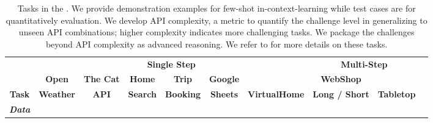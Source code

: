 


\begin{table}[]
\centering
\caption{Tasks in the \snact. We provide demonstration examples for few-shot in-context-learning while test cases are for quantitatively evaluation. We develop API complexity, a metric to quantify the challenge level in generalizing to unseen API combinations; higher complexity indicates more challenging tasks. We package the challenges beyond API complexity as advanced reasoning. We refer to  for more details on these tasks.}
\label{tab:all_tasks}
\begin{adjustbox}{max width=\textwidth}
\begin{tabular}{@{}cccccccccc@{}}
\toprule
\multicolumn{1}{l}{}            & \multicolumn{6}{c}{\textbf{Single Step}}                                         & \multicolumn{2}{c}{\textbf{Multi-Step}}                                                             \\
\cmidrule(lr){2-7} \cmidrule(lr){8-9} 
                                & \textbf{Open}                           & \textbf{The Cat}                    & \textbf{Home}        & \textbf{Trip}        & \textbf{Google}      &                                        &                   \textbf{WebShop}                 &                                     \\
\multirow{-2}{*}{\textbf{Task}} & {\color[HTML]{1F1F1F} \textbf{Weather}} & {\color[HTML]{1F1F1F} \textbf{API}} & \textbf{Search}      & \textbf{Booking}     & \textbf{Sheets}      & \multirow{-2}{*}{\textbf{VirtualHome}} & \textbf{Long / Short} & \multirow{-2}{*}{\textbf{Tabletop}} \\
\midrule
\textbf{\textit{Data}}               &                                         &                                     &                      &                      &                      &                                        &                                    & \multicolumn{1}{l}{}                \\

\end{tabular}
\end{adjustbox}
\end{table}
